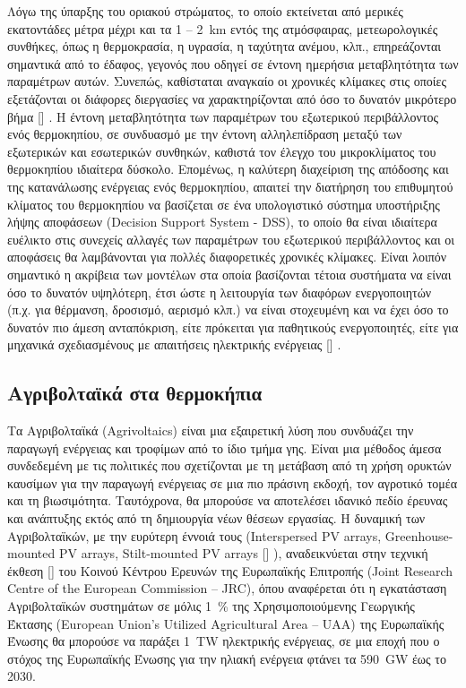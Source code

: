 \documentclass[12pt, a4paper]{report} %
\DeclareRobustCommand{\lcitep}[1]{%
  \english{[\cite{#1}]}%
}
\newcommand{\english}{\foreignlanguage{english}}
\begin{document}
Λόγω της ύπαρξης του οριακού στρώματος, το οποίο εκτείνεται από μερικές εκατοντάδες μέτρα μέχρι και τα 1 – 
\SI{2}{\kilo\meter} εντός της ατμόσφαιρας, μετεωρολογικές συνθήκες, όπως η θερμοκρασία, η υγρασία, η 
ταχύτητα ανέμου, κλπ., επηρεάζονται σημαντικά από το έδαφος, γεγονός που οδηγεί σε έντονη ημερήσια 
μεταβλητότητα των παραμέτρων αυτών. Συνεπώς, καθίσταται αναγκαίο οι χρονικές κλίμακες στις οποίες 
εξετάζονται οι διάφορες διεργασίες να χαρακτηρίζονται από όσο το δυνατόν μικρότερο βήμα \lcitep{neural_bib1}. 
Η έντονη μεταβλητότητα των παραμέτρων του εξωτερικού περιβάλλοντος ενός θερμοκηπίου, σε συνδυασμό με την 
έντονη αλληλεπίδραση μεταξύ των εξωτερικών και εσωτερικών συνθηκών, καθιστά τον έλεγχο του μικροκλίματος 
του θερμοκηπίου ιδιαίτερα δύσκολο. Επομένως, η καλύτερη διαχείριση της απόδοσης και της κατανάλωσης 
ενέργειας ενός θερμοκηπίου, απαιτεί την διατήρηση του επιθυμητού κλίματος του θερμοκηπίου να βασίζεται σε ένα 
υπολογιστικό σύστημα υποστήριξης λήψης αποφάσεων (\english{Decision Support System - DSS}), το οποίο θα είναι 
ιδιαίτερα ευέλικτο στις συνεχείς αλλαγές των παραμέτρων του εξωτερικού περιβάλλοντος και οι αποφάσεις θα 
λαμβάνονται για πολλές διαφορετικές χρονικές κλίμακες. Είναι λοιπόν σημαντικό η ακρίβεια των μοντέλων στα 
οποία βασίζονται τέτοια συστήματα να είναι όσο το δυνατόν υψηλότερη, έτσι ώστε η λειτουργία των διαφόρων 
ενεργοποιητών (π.χ. για θέρμανση, δροσισμό, αερισμό κλπ.) να είναι στοχευμένη και να έχει όσο το δυνατόν πιο 
άμεση ανταπόκριση, είτε πρόκειται για παθητικούς ενεργοποιητές, είτε για μηχανικά σχεδιασμένους με 
απαιτήσεις ηλεκτρικής ενέργειας \lcitep{neural_bib2,neural_bib3,neural_bib4}.

\subsection{Αγριβολταϊκά στα θερμοκήπια}\label{sub_agrivoltaics}
Τα Αγριβολταϊκά (\english{Agrivoltaics}) είναι μια εξαιρετική λύση που συνδυάζει την παραγωγή ενέργειας και τροφίμων 
από το ίδιο τμήμα γης. Είναι μια μέθοδος άμεσα συνδεδεμένη με τις πολιτικές που σχετίζονται με τη μετάβαση από τη 
χρήση ορυκτών καυσίμων για την παραγωγή ενέργειας σε μια πιο πράσινη εκδοχή, τον αγροτικό τομέα και τη βιωσιμότητα. 
Ταυτόχρονα, θα μπορούσε να αποτελέσει ιδανικό πεδίο έρευνας και ανάπτυξης εκτός από τη δημιουργία νέων θέσεων εργασίας. Η 
δυναμική των Αγριβολταϊκών, με την ευρύτερη έννοιά τους (\english{Interspersed PV arrays, Greenhouse-mounted PV 
arrays, Stilt-mounted PV arrays} \lcitep{eisagwgi_adv_alg_bib1}), αναδεικνύεται στην τεχνική έκθεση 
\lcitep{eisagwgi_adv_alg_bib2} του Κοινού Κέντρου Ερευνών της Ευρωπαϊκής Επιτροπής (\english{Joint Research Centre 
of the European Commission – JRC}), όπου αναφέρεται ότι η εγκατάσταση Αγριβολταϊκών συστημάτων σε μόλις 
\SI{1}{\percent} της Χρησιμοποιούμενης Γεωργικής Έκτασης (\english{European Union's Utilized Agricultural Area – UAA}) 
της Ευρωπαϊκής Ένωσης θα μπορούσε να παράξει \SI{1}{\tera\watt} ηλεκτρικής ενέργειας, σε μια εποχή που ο στόχος της 
Ευρωπαϊκής Ένωσης για την ηλιακή ενέργεια φτάνει τα \SI{590}{\giga\watt} έως το 2030.
\end{document}
